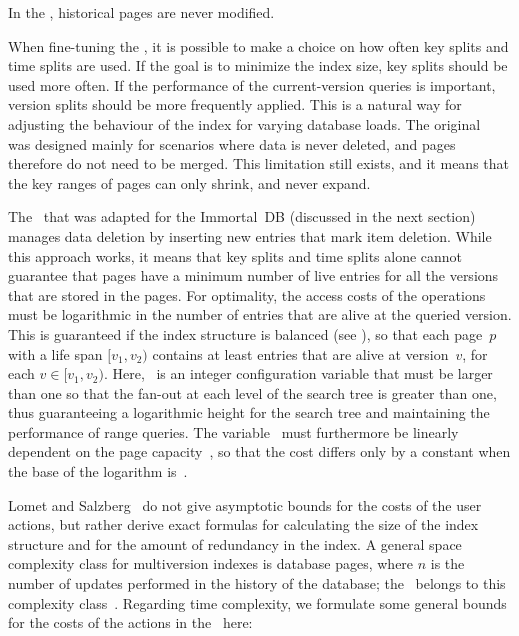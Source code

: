 \thmskip
\begin{invariant}
\label{inv:tsb:historical-immutable}
In the \TSBtree, historical pages are never modified.
\end{invariant}
\thmskip

When fine-tuning the \TSBtree, it is possible to make a choice on how often 
key splits and time splits are used.
If the goal is to minimize the index size, key splits should be used more
often.
If the performance of the current-version queries is important, version
splits should be more frequently applied.
This is a natural way for adjusting the behaviour of the index for varying
database loads.
The original \TSBtree~\cite{lomet:1989:tsb} was designed mainly for
scenarios where data is never deleted, and pages therefore do not need to be
merged.
This limitation still exists, and it means that the key ranges of pages can
only shrink, and never expand. 

The \TSBtree\ that was adapted for the Immortal~DB (discussed in the next
section) manages data deletion by inserting new entries that mark item
deletion. 
While this approach works, it means that key splits and time splits
alone cannot guarantee that pages have a minimum number of live entries for
all the versions that are stored in the pages.
For optimality, the access costs of the operations must be
logarithmic in the number of entries that are alive at the queried version.
This is guaranteed if the index structure is balanced (see
), so that each page~$p$ with a life span
$[v_1, v_2)$ contains at least \minlive{}\label{def:minlive}
entries that are alive at version~$v$, for each $v \in [v_1, v_2)$.
Here, \minlive\ is an integer configuration variable that must be larger than
one so that the fan-out at each level of the search tree is greater than one,
thus guaranteeing a logarithmic height for the search tree and maintaining
the performance of range queries.
The variable \minlive\ must furthermore be linearly dependent on the page
capacity~\capacity, so that the cost differs only by a constant when the base
of the logarithm is~\capacity.

Lomet and Salzberg~\cite{lomet:1989:tsb,lomet:1990:tsb-performance} do not
give asymptotic bounds for the costs of the user actions, but rather
derive exact formulas for calculating the size of the index structure and
for the amount of redundancy in the index. 
A general space complexity class for multiversion indexes is 
database pages, where $n$ is the number of updates performed in the history of
the database; the \TSBtree\ belongs to this complexity
class~\cite{salzberg:1999:comparison}.
Regarding time complexity, we formulate some general bounds for the costs of
the actions in the \TSBtree\ here:

